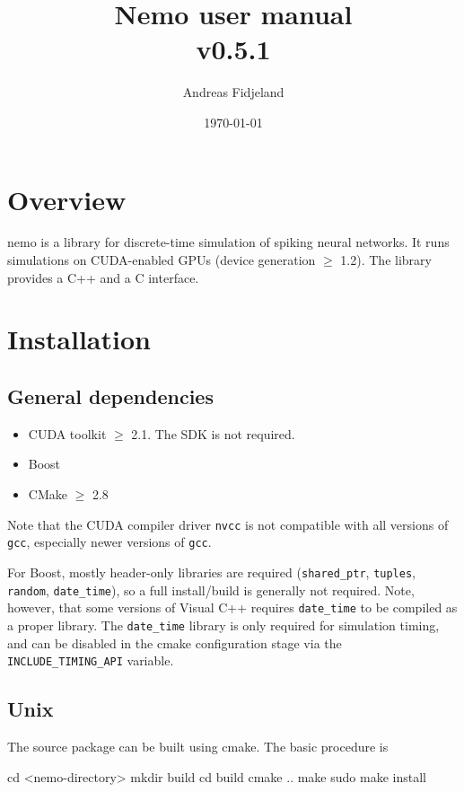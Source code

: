 \documentclass[a4paper]{article}
\title{Nemo user manual\\v0.5.1}
\author{Andreas Fidjeland}
\date{\today}
\newcommand{\code}[1]{\texttt{#1}}
\newcommand{\command}[1]{\texttt{#1}}
\newcommand{\library}[1]{\texttt{#1}}
\begin{document}
\maketitle

\section{Overview}

nemo is a library for discrete-time simulation of spiking neural networks.
It runs simulations on CUDA-enabled GPUs (device generation $\geq$ 1.2).
The library provides a C++ and a C interface. 

\section{Installation}

\subsection{General dependencies}

\begin{itemize}
	\item CUDA toolkit $\geq$ 2.1. The SDK is not required.
	\item Boost
	\item CMake $\geq$ 2.8
\end{itemize}

Note that the CUDA compiler driver \command{nvcc} is not compatible with all versions
of \command{gcc}, especially newer versions of \command{gcc}.

For Boost, mostly header-only libraries are required (\library{shared\_ptr}, \library{tuples},
\library{random}, \library{date\_time}), so a full install/build is generally not required. 
Note, however, that some versions of Visual C++ requires \library{date\_time} to be compiled as
a proper library. 
The \library{date\_time} library is only required for simulation timing,
	and can be disabled in the cmake configuration stage via the \code{INCLUDE\_TIMING\_API} variable.

\subsection{Unix}

The source package can be built using cmake. The basic procedure is 

\begin{shell}
cd <nemo-directory>
mkdir build
cd build
cmake ..
make
sudo make install
\end{shell}
\end{document}
